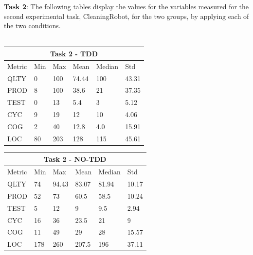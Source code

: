 \noindent \textbf{Task 2}: The following tables display the values for the variables measured for the second experimental task, CleaningRobot, for the two groups, by applying each of the two conditions.
\\ \  \\
\noindent
\begin{tabular}{ |p{2cm}||p{1.6cm}|p{1.6cm}|p{1.6cm}|p{1.6cm}|p{1.6cm}|}
    \hline
        \multicolumn{6}{|c|}{Task 2 - TDD} \\
    \hline
        Metric & Min & Max & Mean & Median & Std\\
    \hline
        QLTY & 0 & 100 & 74.44 & 100 & 43.31 \\
        PROD & 8 & 100 & 38.6 & 21 & 37.35 \\
        TEST & 0 & 13 & 5.4 & 3 & 5.12 \\
        CYC & 9 & 19 & 12 & 10 & 4.06 \\
        COG & 2 & 40 & 12.8 & 4.0 & 15.91 \\
        LOC & 80 & 203 & 128 & 115 & 45.61 \\
    \hline
\end{tabular}

\noindent
\begin{tabular}{ |p{2cm}||p{1.6cm}|p{1.6cm}|p{1.6cm}|p{1.6cm}|p{1.6cm}|}
    \hline
        \multicolumn{6}{|c|}{Task 2 - NO-TDD} \\
    \hline
        Metric & Min & Max & Mean & Median & Std\\
    \hline
        QLTY & 74 & 94.43 & 83.07 & 81.94 & 10.17 \\
        PROD & 52 & 73 & 60.5 & 58.5 & 10.24 \\
        TEST & 5 & 12 & 9 & 9.5 & 2.94 \\
        CYC & 16 & 36 & 23.5 & 21 & 9 \\
        COG & 11 & 49 & 29 & 28 & 15.57 \\
        LOC & 178 & 260 & 207.5 & 196 & 37.11 \\
    \hline
\end{tabular}
\\ \  \\

